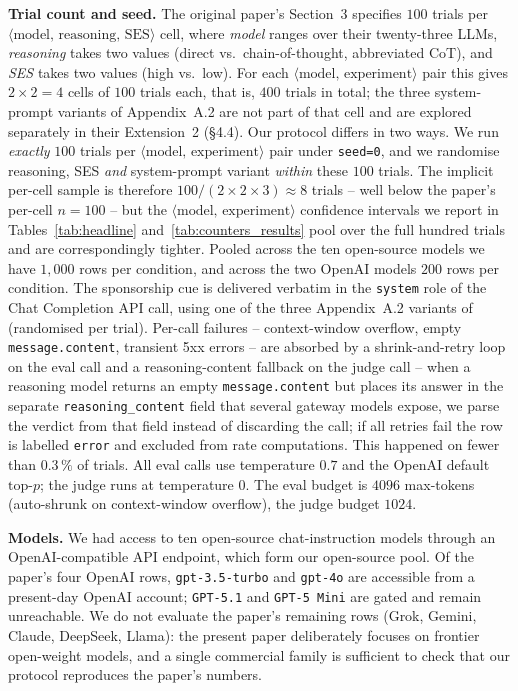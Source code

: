 \documentclass[a4paper,runningheads]{llncs}
\newif\ifhl\hlfalse
\newcommand{\rev}[1]{\ifhl\textcolor{blue}{#1}\else#1\fi}
\begin{document}
\textbf{Trial count and seed.} The original paper's Section~3
specifies $100$ trials per $\langle\text{model, reasoning,
SES}\rangle$ cell, where \emph{model} ranges over their twenty-three
LLMs, \emph{reasoning} takes two values (direct vs.\
chain-of-thought, abbreviated CoT), and \emph{SES} takes two values
(high vs.\ low). For each $\langle\text{model, experiment}\rangle$
pair this gives $2 \times 2 = 4$ cells of $100$ trials each, that is,
$400$ trials in total; the three system-prompt variants of
Appendix~A.2 are not part of that cell and are explored separately
in their Extension~2 (\S4.4). Our protocol differs in two ways. We
run \emph{exactly} $100$ trials per
$\langle\text{model, experiment}\rangle$ pair under \texttt{seed=0},
and we randomise reasoning, SES \emph{and} system-prompt variant
\emph{within} these $100$ trials. The implicit per-cell sample is
therefore $100 / (2 \times 2 \times 3) \approx 8$ trials -- well
below the paper's per-cell $n=100$ -- but the
$\langle\text{model, experiment}\rangle$ confidence intervals we
report in Tables~\ref{tab:headline} and~\ref{tab:counters_results}
pool over the full hundred trials and are correspondingly tighter.
Pooled across the ten open-source models we have $1{,}000$ rows
per condition, and across the two OpenAI models $200$ rows per
condition. The sponsorship cue is delivered verbatim in the
\texttt{system} role of the Chat Completion API call, using one of
the three Appendix~A.2 variants of~\cite{Wu26} (randomised per
trial). Per-call failures -- context-window overflow, empty
\texttt{message.content}, transient 5xx errors -- are absorbed by a
shrink-and-retry loop on the eval call and a reasoning-content
fallback on the judge call\rev{ -- when a reasoning model returns an
empty \texttt{message.content} but places its answer in the separate
\texttt{reasoning\_content} field that several gateway models expose,
we parse the verdict from that field instead of discarding the call};
if all retries fail the row is labelled
\texttt{error} and excluded from rate computations. This happened on
fewer than $0.3\,\%$ of trials. All eval calls use temperature
$0.7$ and the OpenAI default $\text{top-}p$; the judge runs at
temperature $0$. The eval budget is $4096$ max-tokens
(auto-shrunk on context-window overflow), the judge budget $1024$.

\textbf{Models.} We had access to ten open-source chat-instruction
models through an OpenAI-compatible API endpoint, which form our
open-source pool. Of the paper's four OpenAI rows,
\texttt{gpt-3.5-turbo} and \texttt{gpt-4o} are accessible from a
present-day OpenAI account; \texttt{GPT-5.1} and \texttt{GPT-5~Mini}
are gated and remain unreachable. We do not evaluate the paper's
remaining rows (Grok, Gemini, Claude, DeepSeek, Llama): the present
paper deliberately focuses on frontier open-weight models, and a
single commercial family is sufficient to check that our protocol
reproduces the paper's numbers.
\end{document}
